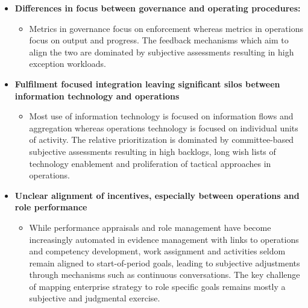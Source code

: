 \begin{itemize}
    \item \textbf{Differences in focus between governance and operating procedures:}
    \begin{itemize}
        \item Metrics in governance focus on enforcement whereas metrics in operations focus on output and progress.
        The feedback mechanisms which aim to align the two are dominated by subjective assessments resulting in
        high exception workloads.
    \end{itemize}
    \item \textbf{Fulfilment focused integration leaving significant silos between information technology and
        operations}
    \begin{itemize}
        \item Most use of information technology is focused on information flows and aggregation whereas operations
        technology is focused on individual units of activity. The relative prioritization is dominated by
        committee-based subjective assessments resulting in high backlogs,
        long wish lists of technology enablement and proliferation of tactical approaches in operations.
    \end{itemize}
    \item \textbf{Unclear alignment of incentives, especially between operations and role performance}
    \begin{itemize}
        \item While performance appraisals and role management have become increasingly automated in evidence
        management with links to operations and competency development, work assignment and activities seldom
        remain aligned to start-of-period goals, leading to subjective adjustments through mechanisms such as
        continuous conversations.
        The key challenge of mapping enterprise strategy to role specific goals remains mostly a
        subjective and judgmental exercise.
    \end{itemize}
\end{itemize}




